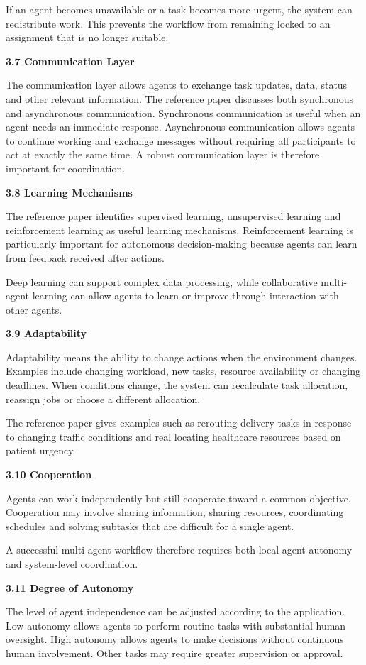 \documentclass[12pt,letterpaper]{article}
\newcommand{\sectiontitle}[1]{%
  \vspace{6pt}%
  {\noindent\fontsize{13.2pt}{16pt}\selectfont\bfseries #1\par}%
  \vspace{2pt}%
}
\begin{document}
If an agent becomes unavailable or a task becomes more urgent, the system can redistribute work. This prevents the workflow from remaining locked to an assignment that is no longer suitable.

\sectiontitle{3.7 Communication Layer}
The communication layer allows agents to exchange task updates, data, status and other relevant information. The reference paper discusses both synchronous and asynchronous communication. Synchronous communication is useful when an agent needs an immediate response. Asynchronous communication allows agents to continue working and exchange messages without requiring all participants to act at exactly the same time. A robust communication layer is therefore important for coordination.
\newpage

\sectiontitle{3.8 Learning Mechanisms}
The reference paper identifies supervised learning, unsupervised learning and reinforcement learning as useful learning mechanisms. Reinforcement learning is particularly important for autonomous decision-making because agents can learn from feedback received after actions.

Deep learning can support complex data processing, while collaborative multi-agent learning can allow agents to learn or improve through interaction with other agents.

\sectiontitle{3.9 Adaptability}
Adaptability means the ability to change actions when the environment changes. Examples include changing workload, new tasks, resource availability or changing deadlines. When conditions change, the system can recalculate task allocation, reassign jobs or choose a different allocation.

The reference paper gives examples such as rerouting delivery tasks in response to changing traffic conditions and real locating healthcare  resources  based on patient urgency.

\sectiontitle{3.10 Cooperation}
Agents can work independently but still cooperate toward a common objective. Cooperation may involve sharing information, sharing resources, coordinating schedules and solving subtasks that are difficult for a single agent.

A successful multi-agent workflow therefore requires both local agent autonomy and system-level coordination.

\sectiontitle{3.11 Degree of Autonomy}
The level of agent independence can be adjusted according to the application. Low autonomy allows agents to perform routine tasks with substantial human oversight. High autonomy allows agents to make decisions without continuous human involvement. Other tasks may require greater supervision or approval.
\end{document}
